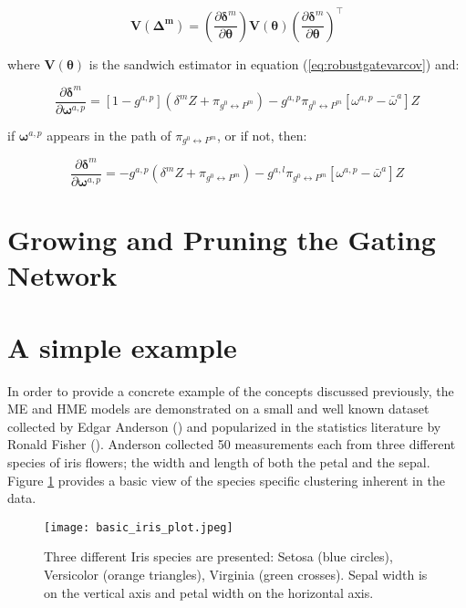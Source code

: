 \documentclass[12pt]{article}
\newcommand{\mean}[1]{\bar{#1}}
\newcommand{\gateprod}[2]{\pi_{#1 \longleftrightarrow #2}}
\begin{document}
\begin{equation}
    \boldsymbol{V}(\boldsymbol{\Delta^{m}}) = \left(\frac{\partial \boldsymbol{\delta}^{m}}{\partial \boldsymbol{\theta}} \right) \boldsymbol{V}(\boldsymbol{\theta})  \left(\frac{\partial \boldsymbol{\delta}^{m}}{\partial \boldsymbol{\theta}} \right)^{\top}
\end{equation}

where $\boldsymbol{V}(\boldsymbol{\theta})$ is the sandwich estimator
in equation (\ref{eq:robustgatevarcov}) and:

\begin{equation}
  \frac{\partial \boldsymbol{\delta}^{m}}{\partial \boldsymbol{\omega}^{a,p}} = [1 - g^{a, p}] (\delta^{m} Z + \gateprod{g^{0}}{P^{m}}) - g^{a,p} \gateprod{g^{0}}{P^{m}} [\omega^{a,p} - \mean{\omega}^{a}] Z
\end{equation}

if $\boldsymbol{\omega}^{a,p}$ appears in the path of $\gateprod{g^{0}}{P^{m}}$, or if not,
then:

\begin{equation}
  \frac{\partial \boldsymbol{\delta}^{m}}{\partial \boldsymbol{\omega}^{a,p}} = -g^{a, p} (\delta^{m} Z + \gateprod{g^{0}}{P^{m}}) - g^{a,l} \gateprod{g^{0}}{P^{m}} [\omega^{a,p} - \mean{\omega}^{a}] Z
\end{equation}


\section{Growing and Pruning the Gating Network} \label{sec:NetworkGrowth}


\section{A simple example} \label{sec:SimpleExample}

In order to provide a concrete example of the concepts discussed previously,
the ME and HME models are demonstrated on a small and well known dataset
collected by Edgar Anderson (\cite{Anderson1936}) and popularized in the
statistics literature by Ronald Fisher (\cite{Fisher1936}). Anderson collected
50 measurements each from three different species of iris flowers; the width and
length of both the petal and the sepal. Figure \ref{fig:Iris_dataset} provides a
basic view of the species specific clustering inherent in the data.

\begin{figure}[!ht]
  \texttt{[image: basic\_iris\_plot.jpeg]}
  \caption{Three different Iris species are presented: Setosa
  (blue circles), Versicolor (orange triangles), Virginia (green crosses).
  Sepal width is on the vertical axis and petal width on the horizontal
  axis.}
  \label{fig:Iris_dataset}
\end{figure}
\end{document}
